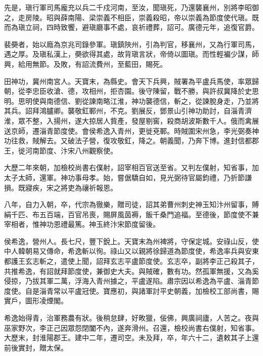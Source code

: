 \begin{pinyinscope}
 先是，瑱行軍司馬龐充以兵二千戍河南，至汝，聞瑱死，乃還襲襄州，別將李昭御之，走房陵。昭與薛南陽、梁崇義不相臣，崇義殺昭，帝以崇義為節度使代瑱。既而為瑱立祠，四時致饗，避瑱廳事不處，哀祈禮葬，詔可。廣德元年，追復官爵。



 裴奰者，始以廕為京兆司錄參軍。瑱鎮陜州，引為判官，移襄州，又為行軍司馬，遇之厚。及瑱私漢上，奰欲得其處，故背瑱言狀，帝倚以圖瑱。而性輕褊少謀，師興，給用無節。及敗，有詔流費州，至藍田，賜死。



 田神功，冀州南宮人。天寶末，為縣史。會天下兵興，賊署為平盧兵馬使，率眾歸朝，從李忠臣收滄、德，攻相州，拒杏園。後守陳留，戰不勝，與許叔冀降於史思明。思明使與南德信、劉從諫南略江淮，神功襲德信，斬之，從諫脫身走，乃並將其兵。詔拜鴻臚卿。襲敬釭鄆州，不克。劉展反，鄧景山引神功助討，自淄青濟淮，眾不整，入揚州，遂大掠居人貲產，發屋剔窖，殺商胡波斯數千人。俄而禽展送京師，遷淄青節度使。會侯希逸入青州，更徙兗鄆。時賊圍宋州急，李光弼奏神功往救，賊解去。又破法子營，復攻敬釭，降之。朝義聞，乃奔下博。進封信都郡王，徙河南節度、汴宋八州觀察使。



 大歷二年來朝，加檢校尚書右僕射，詔宰相百官送至省。又判左僕射，知省事，加太子太師，還軍。神功事母孝。始，嘗倨驕自如，見光弼待官屬鈞禮，乃折節謙損。既寢疾，宋之將吏為禳祈報恩。



 八年，自力入朝，卒，代宗為徹樂，贈司徒，詔其弟曹州刺史神玉知汴州留事，賻絹千匹、布五百端，百官吊喪，賜屏風茵褥，飯千桑門追福。至德後，節度使不兼宰相者，惟神功恩禮最篤。神玉終汴宋節度留後。



 侯希逸，營州人。長七尺，豐下銳上。天寶末為州裨將，守保定城。安祿山反，使中人韓朝易又傳命，希逸斬以徇。祿山又以親將徐歸道為節度使，希逸率兵與安東都護王玄志斬之，遣使上聞，詔拜玄志平盧節度使。玄志卒，副將李正己殺其子，共推希逸，有詔就拜節度使，兼御史大夫。與賊確，數有功。然孤軍無援，又為奚侵掠，乃拔其軍二萬，浮海入青州據之，平盧遂陷。肅宗因以希逸為平盧、淄青節度使。自是淄青常以平盧冠使。寶應初，與諸軍討平史朝義，加檢校工部尚書，賜實戶，圖形凌煙閣。



 希逸始得青，治軍務農有狀。後稍怠肆，好畋獵，佞佛，興廣祠廬，人苦之。夜與巫家野次，李正己因眾怨閉闔不內，遂奔滑州。召還，檢校尚書右僕射，知省事。大歷末，封淮陽郡王。建中二年，遷司空。未及拜，卒，年六十二，遺敕其子上還前後實封，贈太保。




\end{pinyinscope}

